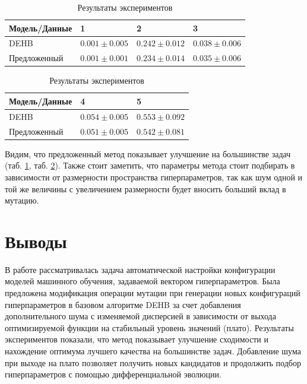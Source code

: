 \documentclass[a4paper,12pt]{article}
\begin{document}
\begin{table}[h]
\centering
\begin{tabular}{|l|l|l|l|}
\hline
Модель/Данные & 1                & 2                & 3                \\ \hline
DEHB           & $0.001\pm0.005$	& $\mathbf{0.242\pm0.012}$	& $0.038\pm0.006$	\\ \hline
Предложенный       & $\mathbf{0.001\pm0.001}$	& $0.234\pm0.014$	& $\mathbf{0.035\pm0.006}$	\\ \hline
\end{tabular}
\caption{Результаты экспериментов}
\label{tab:dehbrf1}
\end{table}

\begin{table}[h]
\centering
\begin{tabular}{|l|l|l|}
\hline
Модель/Данные  & 4               & 5                \\ \hline
DEHB           & $0.054\pm0.005$	& $0.553\pm0.092$  \\ \hline
Предложенный       	& $\mathbf{0.051\pm0.005}$	& $\mathbf{0.542\pm0.081}$ \\ \hline
\end{tabular}
\caption{Результаты экспериментов}
\label{tab:dehbrf2}
\end{table}

Видим, что предложенный метод показывает улучшение на большинстве задач (таб. \ref{tab:dehbrf1}, таб. \ref{tab:dehbrf2}).
Также стоит заметить, что параметры метода стоит подбирать в зависимости от размерности пространства гиперпараметров, так как шум одной и той же величины с увеличением размерности будет вносить больший вклад в мутацию.

\section{Выводы}
В работе рассматривалась задача автоматической настройки конфигурации моделей машинного обучения, задаваемой вектором гиперпараметров. Была предложена модификация операции мутации при генерации новых конфигураций гиперпараметров в базовом алгоритме DEHB за счет добавления дополнительного шума с изменяемой дисперсией в зависимости от выхода оптимизируемой функции на стабильный уровень значений (плато). Результаты экспериментов показали, что метод показывает улучшение сходимости и нахождение оптимума лучшего качества на большинстве задач. Добавление шума при выходе на плато позволяет получить новых кандидатов и продолжить подбор гиперпараметров с помощью дифференциальной эволюции.
\end{document}
